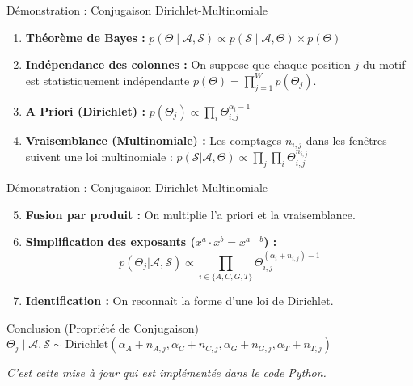 \documentclass[10pt]{beamer}
\begin{document}
\begin{frame}{Démonstration : Conjugaison Dirichlet-Multinomiale}
    \begin{enumerate}
        \item \textbf{Théorème de Bayes :} 
        $p(\Theta \mid \mathcal{A}, \mathcal{S}) \propto p(\mathcal{S} \mid \mathcal{A}, \Theta) \times p(\Theta)$
        \item \textbf{Indépendance des colonnes :} On suppose que chaque position $j$ du motif est statistiquement indépendante $p(\Theta) = \prod_{j=1}^{W} p(\Theta_j)$.
        \item \textbf{A Priori (Dirichlet) :} 
        $p(\Theta_j) \propto \prod_{i} \Theta_{i,j}^{\alpha_i - 1}$
        \item \textbf{Vraisemblance (Multinomiale) :} Les comptages $n_{i,j}$ dans les fenêtres suivent une loi multinomiale :
        $p(\mathcal{S} | \mathcal{A}, \Theta) \propto \prod_{j} \prod_{i} \Theta_{i,j}^{n_{i,j}}$
    \end{enumerate}
\end{frame}

\begin{frame}{Démonstration : Conjugaison Dirichlet-Multinomiale}
    \begin{enumerate}
        \setcounter{enumi}{4}
        \item \textbf{Fusion par produit :} On multiplie l'a priori et la vraisemblance.
        \item \textbf{Simplification des exposants ($x^a \cdot x^b = x^{a+b}$) :}
        \begin{equation}
            p(\Theta_j | \mathcal{A}, \mathcal{S}) \propto \prod_{i \in \{A,C,G,T\}} \Theta_{i,j}^{(\alpha_i + n_{i,j}) - 1}
        \end{equation}
        \item \textbf{Identification :} On reconnaît la forme d'une loi de Dirichlet.
    \end{enumerate}
    \begin{block}{Conclusion (Propriété de Conjugaison)}
        $\Theta_j \mid \mathcal{A}, \mathcal{S} \sim \text{Dirichlet}(\alpha_A + n_{A,j}, \alpha_C + n_{C,j}, \alpha_G + n_{G,j}, \alpha_T + n_{T,j})$
    \end{block}
    \textit{C'est cette mise à jour qui est implémentée dans le code Python.}
\end{frame}
\end{document}
